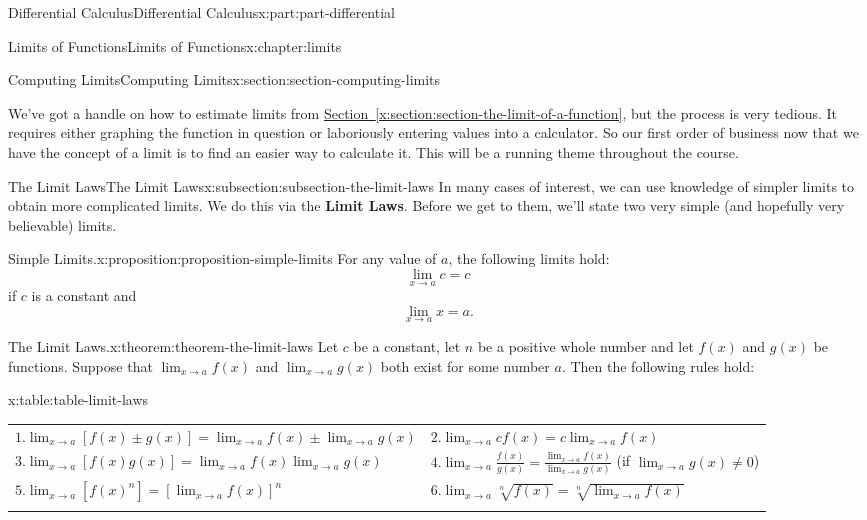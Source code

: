 \documentclass[twoside,10pt,]{tufte-book}
\newcommand{\tabularfont}{\relax}
\newcommand{\xreffont}{\relax}
\newcommand{\terminology}[1]{\textbf{#1}}
\numberwithin{equation}{part}
\newcommand{\hrulethick} {\noalign{\hrule height 0.11em}}
\begin{document}
\begin{partptx}{Differential Calculus}{}{Differential Calculus}{}{}{x:part:part-differential}
\begin{chapterptx}{Limits of Functions}{}{Limits of Functions}{}{}{x:chapter:limits}
\begin{sectionptx}{Computing Limits}{}{Computing Limits}{}{}{x:section:section-computing-limits}
\begin{introduction}{}
We've got a handle on how to estimate limits from \hyperref[x:section:section-the-limit-of-a-function]{Section~{\xreffont\ref{x:section:section-the-limit-of-a-function}}}, but the process is very tedious. It requires either graphing the function in question or laboriously entering values into a calculator. So our first order of business now that we have the concept of a limit is to find an easier way to calculate it. This will be a running theme throughout the course.%
\end{introduction}%
%
%
\typeout{************************************************}
\typeout{************************************************}
%
\begin{subsectionptx}{The Limit Laws}{}{The Limit Laws}{}{}{x:subsection:subsection-the-limit-laws}
In many cases of interest, we can use knowledge of simpler limits to obtain more complicated limits. We do this via the \terminology{Limit Laws}. Before we get to them, we'll state two very simple (and hopefully very believable) limits.%
\begin{proposition}{Simple Limits.}{}{x:proposition:proposition-simple-limits}%
For any value of \(a\), the following limits hold:%
\begin{equation*}
\lim_{x\to a}c = c
\end{equation*}
if \(c\) is a constant and%
\begin{equation*}
\lim_{x\to a}x = a.
\end{equation*}
%
\end{proposition}
\begin{theorem}{The Limit Laws.}{}{x:theorem:theorem-the-limit-laws}%
Let \(c\) be a constant, let \(n\) be a positive whole number and let \(f(x)\) and \(g(x)\) be functions. Suppose that \(\lim_{x\to a}f(x)\) and \(\lim_{x\to a}g(x)\) both exist for some number \(a\). Then the following rules hold:%
\begin{tableptx}{\textbf{}}{x:table:table-limit-laws}{}%
\centering%
{\tabularfont%
\begin{tabular}{ll}\hrulethick
\(1. \lim_{x\to a}[f(x)\pm g(x)] = \lim_{x\to a}f(x)\pm \lim_{x\to a}g(x)\)&\(2. \lim_{x\to a}cf(x) = c\lim_{x\to a}f(x)\)\tabularnewline[0pt]
\(3. \lim_{x\to a}[f(x)g(x)] = \lim_{x\to a}f(x)\lim_{x\to a}g(x)\)&\(4. \lim_{x\to a}\frac{f(x)}{g(x)} = \frac{\lim_{x\to a}f(x)}{\lim_{x\to a}g(x)}\) (if \(\lim_{x\to a}g(x)\neq 0\))\tabularnewline[0pt]
\(5. \lim_{x\to a}[f(x)^{n}] = [\lim_{x\to a}f(x)]^{n}\)&\(6. \lim_{x\to a}\sqrt[n]{f(x)} = \sqrt[n]{\lim_{x\to a}f(x)}\)\tabularnewline\hrulethick

\end{tabular}}
\end{tableptx}
\end{theorem}
\end{subsectionptx}
\end{sectionptx}
\end{chapterptx}
\end{partptx}
\end{document}
